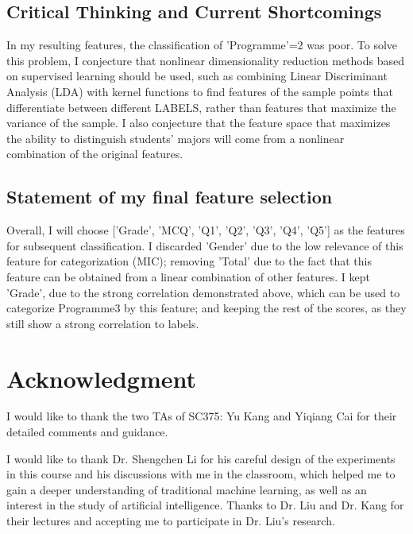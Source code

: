 \documentclass[journal]{IEEEtai}
\begin{document}
\subsection{Critical Thinking and Current Shortcomings}
In my resulting features, the classification of 'Programme'=2 was poor. To solve this problem, I conjecture that nonlinear dimensionality reduction methods based on supervised learning should be used, such as combining Linear Discriminant Analysis (LDA) with kernel functions to find features of the sample points that differentiate between different LABELS, rather than features that maximize the variance of the sample. I also conjecture that the feature space that maximizes the ability to distinguish students' majors will come from a nonlinear combination of the original features.

\subsection{Statement of my final feature selection}
Overall, I will choose ['Grade', 'MCQ', 'Q1', 'Q2', 'Q3', 'Q4', 'Q5'] as the features for subsequent classification. I discarded 'Gender' due to the low relevance of this feature for categorization (MIC); removing 'Total' due to the fact that this feature can be obtained from a linear combination of other features. I kept 'Grade', due to the strong correlation demonstrated above, which can be used to categorize Programme3 by this feature; and keeping the rest of the scores, as they still show a strong correlation to labels.


\section{\textbf{Acknowledgment}}
I would like to thank the two TAs of SC375: Yu Kang and Yiqiang Cai for their detailed comments and guidance.

I would like to thank Dr. Shengchen Li for his careful design of the experiments in this course and his discussions with me in the classroom, which helped me to gain a deeper understanding of traditional machine learning, as well as an interest in the study of artificial intelligence. Thanks to Dr. Liu and Dr. Kang for their lectures and accepting me to participate in Dr. Liu's research.
\end{document}
